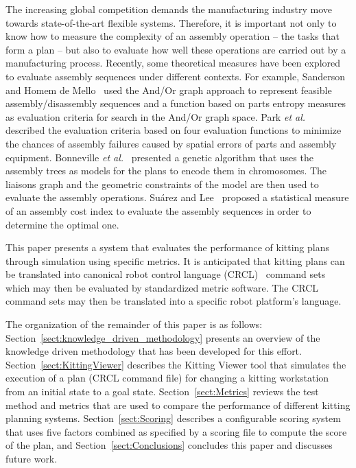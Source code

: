 The increasing global competition demands the manufacturing industry move towards state-of-the-art flexible systems. Therefore, it is important
not only to know how to measure the complexity of an assembly operation --
the tasks that form a plan -- but also to evaluate how well these
operations are carried out by a manufacturing process. Recently, some
theoretical measures have been explored to evaluate assembly sequences
under different contexts. For example, Sanderson and Homem de
Mello~\cite{SANDERSON.1987} used the And/Or graph approach to represent
feasible assembly/disassembly sequences and a function based on parts
entropy measures as evaluation criteria for search in the And/Or graph
space. Park \textit{et al.}~\cite{PARK.1991} described the evaluation
criteria based on four evaluation functions to minimize the chances of
assembly failures caused by spatial errors of parts and assembly equipment.
Bonneville \textit{et al.}~\cite{BONNEVILLE.1995} presented a genetic
algorithm that uses the assembly trees as models for the plans to encode
them in chromosomes. The liaisons graph and the geometric constraints of
the model are then used to evaluate the assembly operations. Su\'{a}rez and
Lee~\cite{SUAREZ.1997} proposed a statistical measure of an assembly cost
index to evaluate the assembly sequences in order to determine the optimal
one.


This paper presents a system that evaluates the performance of kitting plans through simulation using specific metrics. It is anticipated that kitting
plans can be translated into canonical robot control language
(CRCL)~\cite{NISTIR.Balakirsky} command sets which may then be evaluated
by standardized metric software. The CRCL command sets may then be
translated into a specific robot platform's language.

The organization of the remainder of this paper is as follows:
Section~\ref{sect:knowledge_driven_methodology} presents an overview of the
knowledge driven methodology that has been developed for this effort.
Section~\ref{sect:KittingViewer} describes the Kitting Viewer tool that
simulates the execution of a plan (CRCL command file) for changing a
kitting workstation from an initial state to a goal state.
Section~\ref{sect:Metrics} reviews the test method and metrics that are
used to compare the performance of different kitting planning systems.
Section~\ref{sect:Scoring} describes a configurable scoring system that
uses five factors combined as specified by a scoring file to compute the
score of the plan, and Section~\ref{sect:Conclusions} concludes this paper
and discusses future work.


